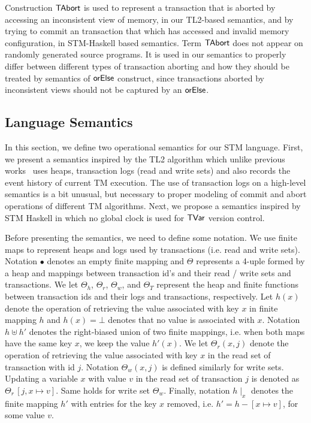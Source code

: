 \documentclass[sigplan]{acmart}
\theoremstyle{definition}
\newcommand{\D}[1]{\blue{\mathsf{#1}}}
\newcommand{\C}[1]{\red{\mathsf{#1}}}
\newcommand{\F}[1]{\green{\mathsf{#1}}}
\begin{document}
Construction \ensuremath{\C{TAbort}} is used to represent a transaction
that is aborted by accessing an inconsistent view of memory,
in our TL2-based semantics, and by trying to commit an transaction that
which has accessed and invalid memory configuration, in STM-Haskell based semantics.
Term \ensuremath{\C{TAbort}} does not appear on randomly
generated source programs.
It is used in our semantics to properly
differ between different types of transaction aborting and how
they should be treated by semantics of \ensuremath{\F{orElse}} construct, since
transactions aborted by inconsistent views should not be captured
by an \ensuremath{\F{orElse}}.


\subsection{Language Semantics}\label{sec:stm-semantics}

In this section, we define two operational semantics for our STM language. First, we
present a semantics inspired by the TL2 algorithm which unlike previous works~\cite{Harris05,Hu08}
uses heaps, transaction logs (read and write sets) and also records the event history of current
TM execution. The use of transaction logs on a high-level semantics is a bit unusual, but necessary
to proper modeling of commit and abort operations of different TM algorithms. Next, we propose a
semantics inspired by STM Haskell in which no global clock is used for \ensuremath{\D{TVar}} version control.


Before presenting the semantics, we need to define some notation.
We use finite maps to  represent heaps and logs used by transactions (i.e. read and write
sets). Notation $\bullet$ denotes an empty finite mapping and
$\Theta$ represents a 4-uple formed by a heap and mappings between transaction id's and their
read / write sets and transactions. We let $\Theta_h$, $\Theta_r$, $\Theta_w$, and $\Theta_T$ represent the heap and finite
functions between transaction ids and their logs and transactions,
respectively. Let $h(x)$ denote the operation
of retrieving the value associated with key $x$ in finite mapping 
$h$ and $h(x)=\bot$ denotes that no value is associated
with $x$. Notation $h \uplus h'$ denotes the right-biased union of 
two finite mappings, i.e. when both maps have the same key $x$, we keep
the value $h'(x)$. We let $\Theta_r(x,j)$ denote the operation of
retrieving the value associated with key $x$ in the read set of transaction
with id $j$. Notation $\Theta_w(x,j)$ is defined similarly for write sets. Updating
a variable $x$ with value $v$ in the read set of transaction $j$ is denoted as
$\Theta_r\,[j,x\mapsto v]$. Same holds for write set $\Theta_w$.
Finally, notation $h\mid_{x}$ denotes the finite mapping $h'$ with entries for the key $x$
removed, i.e. $h' = h - [ x \mapsto v]$, for some value $v$.
\end{document}
